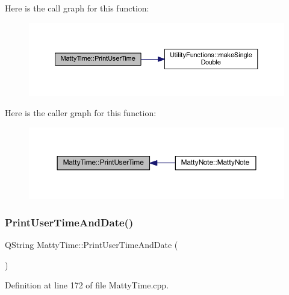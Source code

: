 Here is the call graph for this function\+:
\nopagebreak
\begin{figure}[H]
\begin{center}
\leavevmode
\includegraphics[width=350pt]{classMattyTime_a9cbf666ccbe45a8ca45f9ffc42d5102c_cgraph}
\end{center}
\end{figure}
Here is the caller graph for this function\+:
\nopagebreak
\begin{figure}[H]
\begin{center}
\leavevmode
\includegraphics[width=350pt]{classMattyTime_a9cbf666ccbe45a8ca45f9ffc42d5102c_icgraph}
\end{center}
\end{figure}
\hypertarget{classMattyTime_afa30c1dd3bae1e8f50e816803f39d1c4}{}\label{classMattyTime_afa30c1dd3bae1e8f50e816803f39d1c4} 
\subsubsection{\texorpdfstring{Print\+User\+Time\+And\+Date()}{PrintUserTimeAndDate()}}
{\footnotesize\ttfamily Q\+String Matty\+Time\+::\+Print\+User\+Time\+And\+Date (\begin{DoxyParamCaption}{ }\end{DoxyParamCaption})}



Definition at line 172 of file Matty\+Time.\+cpp.

